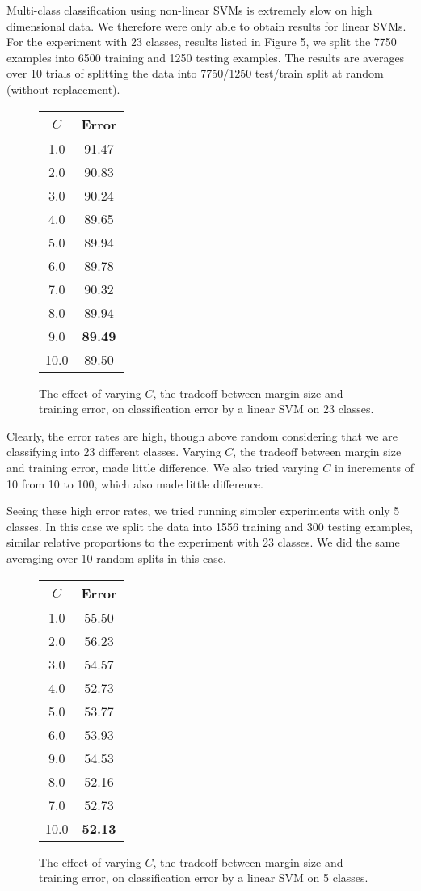 \documentclass[12pt]{article}
\begin{document}
Multi-class classification using non-linear SVMs is extremely slow on high dimensional data. We therefore were only able to obtain results for linear SVMs. For the experiment with 23 classes, results listed in Figure 5, we split the 7750 examples into 6500 training and 1250 testing examples. The results are averages over 10 trials of splitting the data into 7750/1250 test/train split at random (without replacement).
\begin{figure}
\begin{center}
\begin{tabular}{cc}
\hline
{\bf $C$} & {\bf Error} \\ \hline
1.0 & 91.47 \\
2.0 & 90.83 \\
3.0 & 90.24 \\
4.0 & 89.65 \\
5.0 & 89.94 \\
6.0 & 89.78 \\
7.0 & 90.32 \\
8.0 & 89.94 \\
9.0 & {\bf 89.49} \\
10.0 & 89.50
\end{tabular}
\end{center}
\caption{The effect of varying $C$, the tradeoff between margin size and training error, on classification error by a linear SVM on 23 classes.}
\end{figure}

Clearly, the error rates are high, though above random considering that we are classifying into 23 different classes. Varying $C$, the tradeoff between margin size and training error, made little difference. We also tried varying $C$ in increments of 10 from 10 to 100, which also made little difference.

Seeing these high error rates, we tried running simpler experiments with only 5 classes. In this case we split the data into 1556 training and 300 testing examples, similar relative proportions to the experiment with 23 classes. We did the same averaging over 10 random splits in this case.

\begin{figure}
\begin{center}
\begin{tabular}{cc}
\hline
{\bf $C$} & {\bf Error} \\ \hline
1.0 & 55.50 \\
2.0 & 56.23 \\
3.0 & 54.57 \\
4.0 & 52.73 \\
5.0 & 53.77 \\
6.0 & 53.93 \\
9.0 & 54.53 \\
8.0 & 52.16 \\
7.0 & 52.73 \\
10.0 & {\bf 52.13}
\end{tabular}
\end{center}
\caption{The effect of varying $C$, the tradeoff between margin size and training error, on classification error by a linear SVM on 5 classes.}
\end{figure}
\end{document}
